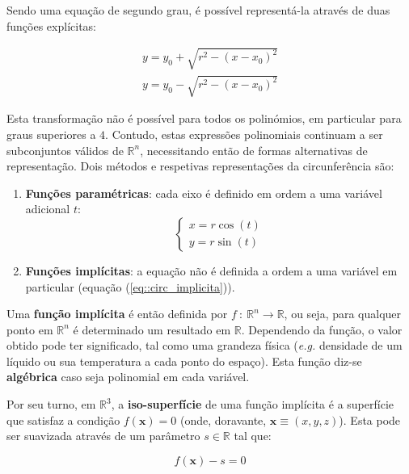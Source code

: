 Sendo uma equação de segundo grau, é possível representá-la através de duas funções explícitas:

\begin{eqnarray}
		y = y_0 + \sqrt{r^2 - (x - x_0)^2} \\
		y = y_0 - \sqrt{r^2 - (x - x_0)^2}
\end{eqnarray}

Esta transformação não é possível para todos os polinómios, em particular para graus superiores a $4$. Contudo, estas expressões polinomiais continuam a ser subconjuntos válidos de $\mathbb{R}^n$, necessitando então de formas alternativas de representação. Dois métodos e respetivas representações da circunferência são:

\begin{enumerate}
	\item \textbf{Funções paramétricas}: cada eixo é definido em ordem a uma variável adicional $t$:
	\begin{equation}
		\left\{\begin{array}{l}
			x = r\cos(t) \\
			y = r\sin(t)
		\end{array}\right.
	\label{eq::circ_parametrica}
	\end{equation}
	
	\item \textbf{Funções implícitas}: a equação não é definida a ordem a uma variável em particular (equação (\ref{eq::circ_implicita})).
\end{enumerate}

Uma \textbf{função implícita} é então definida por $f~:~\mathbb{R}^n \longrightarrow \mathbb{R}$, ou seja, para qualquer ponto em $\mathbb{R}^n$ é determinado um resultado em $\mathbb{R}$. Dependendo da função, o valor obtido pode ter significado, tal como uma grandeza física (\textit{e.g.} densidade de um líquido ou sua temperatura a cada ponto do espaço). Esta função diz-se \textbf{algébrica} caso seja polinomial em cada variável.

Por seu turno, em $\mathbb{R}^3$, a \textbf{iso-superfície} de uma função implícita é a superfície que satisfaz a condição $f(\mathbf{x}) = 0$ (onde, doravante, $\mathbf{x} \equiv (x,y,z)$). Esta pode ser suavizada através de um parâmetro $s \in \mathbb{R}$ tal que:

\begin{equation}
	f(\mathbf{x}) - s = 0
	\label{eq::suavizacao}
\end{equation}


